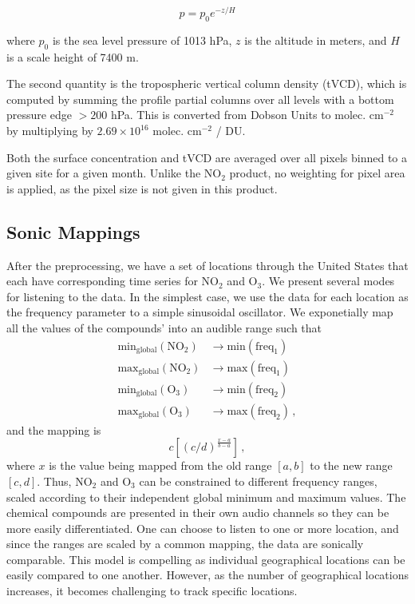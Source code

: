 \documentclass[a4paper,10pt,oneside]{article}
\newcommand{\ce}[1]{$\mathrm{#1}$}
\begin{document}
\begin{sloppy}
	\begin{equation}
	\label{eqn:pres-scale-height}
	p = p_0 e^{-z/H}
	\end{equation}
	
	where $p_0$ is the sea level pressure of 1013 hPa, $z$ is the altitude in meters, and $H$ is a scale height of 7400 m.
	
	The second quantity is the tropospheric vertical column density (tVCD), which is computed by summing the profile partial columns over all levels with a bottom pressure edge $> 200$ hPa. This is converted from Dobson Units to molec. cm$^{-2}$ by multiplying by $2.69 \times 10^{16}$
molec. cm$^{-2}$ / DU. 

	Both the surface concentration and tVCD are averaged over all pixels binned to a given site for a given month. Unlike the \ce{NO_2} product, no weighting for pixel area is applied, as the pixel size is not given in this product.
	 
\subsection{Sonic Mappings}
\label{sec:sonic-mappings}
After the preprocessing, we have a set of locations through the United States that each have corresponding time series for \ce{NO_2} and \ce{O_3}. We present several modes for listening to the data. In the simplest case, we use the data for each location as the frequency parameter to a simple sinusoidal oscillator.  We exponetially map all the values of the compounds' into an audible range such that 
\begin{align}
    \text{min}_{\text{global}}(\text{\ce{NO_2}}) &\rightarrow
    \text{min}(\text{freq}_1) \\
    \text{max}_{\text{global}}(\text{\ce{NO_2}}) &\rightarrow
    \text{max}(\text{freq}_1) \\
    \text{min}_{\text{global}}(\text{\ce{O_3}}) &\rightarrow
    \text{min}(\text{freq}_2) \\
    \text{max}_{\text{global}}(\text{\ce{O_3}}) &\rightarrow
    \text{max}(\text{freq}_2)
    \,,
\end{align}
and the mapping is
\begin{equation}
    c \left[(c/d)^{\frac{x-a}{b-a}}\right]\,,
\end{equation}
where $x$ is the value being mapped from the old range $[a, b]$ to the new range $[c, d]$.  Thus, \ce{NO_2} and \ce{O_3} can be constrained to different frequency ranges, scaled according to their independent global minimum and maximum values.  The chemical compounds are presented in their own audio channels so they can be more easily differentiated.  One can choose to listen to one or more location, and since the ranges are scaled by a common mapping, the data are sonically comparable. This model is compelling as individual geographical locations can be easily compared to one another. However, as the number of geographical locations increases, it becomes challenging to track specific locations. 


\end{sloppy}
\end{document}
